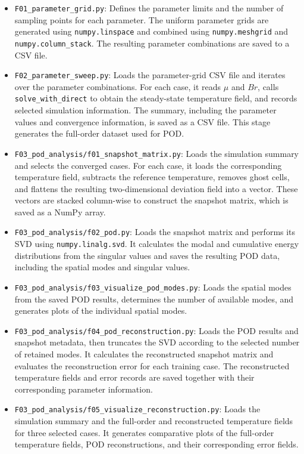 \begin{itemize}
    \item \texttt{F01\_parameter\_grid.py}: Defines the
    parameter limits and the number of sampling points for
    each parameter. The uniform parameter grids are generated
    using \texttt{numpy.linspace} and combined using
    \texttt{numpy.meshgrid} and
    \texttt{numpy.column\_stack}. The resulting parameter
    combinations are saved to a CSV file.

    \item \texttt{F02\_parameter\_sweep.py}: Loads the
    parameter-grid CSV file and iterates over the parameter
    combinations. For each case, it reads $\mu$ and $Br$,
    calls \texttt{solve\_with\_direct} to obtain the
    steady-state temperature field, and records selected
    simulation information. The summary, including the
    parameter values and convergence information, is saved
    as a CSV file. This stage generates the full-order
    dataset used for POD.

    \item \texttt{F03\_pod\_analysis/f01\_snapshot\_matrix.py}:
    Loads the simulation summary and selects the converged
    cases. For each case, it loads the corresponding
    temperature field, subtracts the reference temperature,
    removes ghost cells, and flattens the resulting
    two-dimensional deviation field into a vector. These
    vectors are stacked column-wise to construct the
    snapshot matrix, which is saved as a NumPy array.

    \item \texttt{F03\_pod\_analysis/f02\_pod.py}: Loads the
    snapshot matrix and performs its SVD using
    \texttt{numpy.linalg.svd}. It calculates the modal and
    cumulative energy distributions from the singular
    values and saves the resulting POD data, including
    the spatial modes and singular values.

    \item \texttt{F03\_pod\_analysis/f03\_visualize\_pod\_modes.py}:
    Loads the spatial modes from the saved POD results,
    determines the number of available modes, and generates
    plots of the individual spatial modes.

    \item \texttt{F03\_pod\_analysis/f04\_pod\_reconstruction.py}:
    Loads the POD results and snapshot metadata, then
    truncates the SVD according to the selected number of
    retained modes. It calculates the reconstructed snapshot
    matrix and evaluates the reconstruction error for each
    training case. The reconstructed temperature fields
    and error records are saved together with their
    corresponding parameter information.

    \item \texttt{F03\_pod\_analysis/f05\_visualize\_reconstruction.py}:
    Loads the simulation summary and the full-order and
    reconstructed temperature fields for three selected
    cases. It generates comparative plots of the
    full-order temperature fields, POD reconstructions,
    and their corresponding error fields.
\end{itemize}

